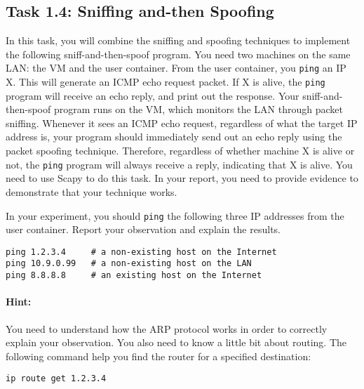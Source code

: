 \subsection{Task 1.4: Sniffing and-then Spoofing}  

In this task, you will combine the sniffing and spoofing techniques
to implement the following sniff-and-then-spoof program.
You need two machines on the same LAN: the VM and the user container. 
From the user container, you
{\tt ping} an IP X. This will generate an ICMP echo
request packet. If X is alive, the {\tt ping} program will receive
an echo reply, and print out the response. Your sniff-and-then-spoof
program runs on the VM, which monitors the LAN through packet sniffing. Whenever it
sees an ICMP echo request, regardless of what the target IP address is,
your program should immediately send out an echo reply using the
packet spoofing technique. Therefore, regardless of whether machine X
is alive or not, the {\tt ping} program will always receive
a reply, indicating that X is alive. You need to use Scapy
to do this task. In your report, you need to provide evidence to demonstrate 
that your technique works. 

In your experiment, you should \texttt{ping} the following three IP addresses
from the user container. 
Report your observation and explain the results. 

\begin{lstlisting}
ping 1.2.3.4     # a non-existing host on the Internet
ping 10.9.0.99   # a non-existing host on the LAN
ping 8.8.8.8     # an existing host on the Internet
\end{lstlisting}

\paragraph{Hint:} You need to understand how the ARP protocol works in order to 
correctly explain your observation. You also need to know a little bit 
about routing. The following command help you find the router
for a specified destination:

\begin{lstlisting}
ip route get 1.2.3.4 
\end{lstlisting}
 
 


